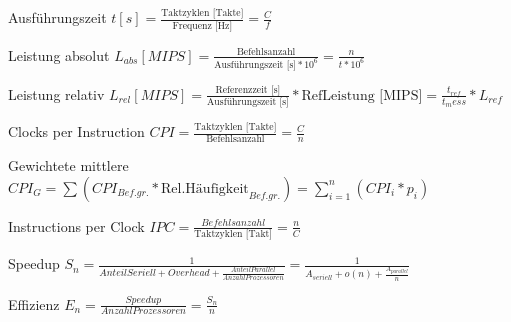 \documentclass[10pt,landscape]{article}
\begin{document}
\begin{multicols}{2}
  \footnotesize
  \begin{description*}
    \item[Ausführungszeit] $t[s]=\frac{\text{Taktzyklen [Takte]}}{\text{Frequenz [Hz]}} =\frac{C}{f}$
    \item[Leistung absolut] $L_{abs}[MIPS]=\frac{\text{Befehlsanzahl}}{\text{Ausführungszeit [s]}*10^6}=\frac{n}{t*10^6}$
    \item[Leistung relativ] $L_{rel}[MIPS]=\frac{\text{Referenzzeit [s]}}{\text{Ausführungszeit [s]}}*\text{RefLeistung [MIPS]} = \frac{t_{ref}}{t_mess}*L_{ref}$
    \item[Clocks per Instruction] $CPI=\frac{\text{Taktzyklen [Takte]}}{\text{Befehlsanzahl}} =\frac{C}{n}$
    \item[Gewichtete mittlere] $CPI_{G}=\sum (CPI_{Bef.gr.}*\text{Rel.Häufigkeit}_{Bef.gr.})=\sum_{i=1}^n(CPI_i*p_i)$
    \item[Instructions per Clock] $IPC=\frac{Befehlsanzahl}{\text{Taktzyklen [Takt]}}=\frac{n}{C}$
    \item[Speedup] $S_n=\frac{1}{AnteilSeriell + Overhead + \frac{AnteilParallel}{AnzahlProzessoren}}=\frac{1}{ A_{seriell} + o(n) + \frac{ A_{parallel} }{ n }}$
    \item[Effizienz] $E_n=\frac{Speedup}{AnzahlProzessoren}=\frac{S_n}{n}$
  \end{description*}
\end{multicols}

\end{document}

